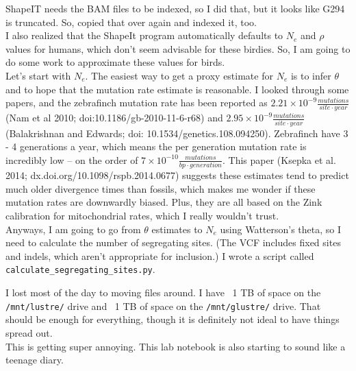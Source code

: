 \documentclass[idxtotoc,hyperref,openany,oneside]{labbook} %
\begin{document}
ShapeIT needs the BAM files to be indexed, so I did that, but it looks like G294 is truncated. So, copied that over again and indexed it, too. \\

I also realized that the ShapeIt program automatically defaults to $N_e$ and $\rho$ values for humans, which don't seem advisable for these birdies. So, I am going to do some work to approximate these values for birds. \\

Let's start with $N_e$. The easiest way to get a proxy estimate for $N_e$ is to infer $\theta$ and to hope that the mutation rate estimate is reasonable. I looked through some papers, and the zebrafinch mutation rate has been reported as $2.21 \times 10^{-9} \frac{mutations}{site \cdot year}$ (Nam et al 2010; doi:10.1186/gb-2010-11-6-r68) and $2.95 \times 10^{-9} \frac{mutations}{site \cdot year}$ (Balakrishnan and Edwards; doi: 10.1534/genetics.108.094250). Zebrafinch have 3 - 4 generations a year, which means the per generation mutation rate is incredibly low -- on the order of $7 \times 10^{-10} \frac{mutations}{bp \cdot generation}$. This paper (Ksepka et al. 2014; dx.doi.org/10.1098/rspb.2014.0677) suggests these estimates tend to predict much older divergence times than fossils, which makes me wonder if these mutation rates are downwardly biased. Plus, they are all based on the Zink calibration for mitochondrial rates, which I really wouldn't trust. \\

Anyways, I am going to go from $\theta$ estimates to $N_e$ using Watterson's theta, so I need to calculate the number of segregating sites. (The VCF includes fixed sites and indels, which aren't appropriate for inclusion.) I wrote a script called \texttt{calculate\_segregating\_sites.py}.



I lost most of the day to moving files around. I have ~1 TB of space on the \texttt{/mnt/lustre/} drive and ~1 TB of space on the \texttt{/mnt/glustre/} drive. That should be enough for everything, though it is definitely not ideal to have things spread out. \\

This is getting super annoying. This lab notebook is also starting to sound like a teenage diary.
\end{document}
